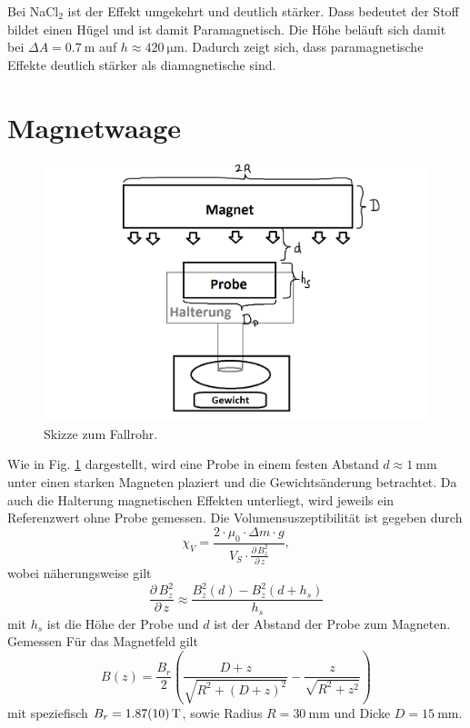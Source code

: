 \documentclass[11pt,a4paper,titlepage, ngerman]{article}
\newcommand{\reffig}[1]{Fig. \ref{fig:#1}}
\begin{document}
	Bei NaCl$_2$ ist der Effekt umgekehrt und deutlich stärker.
	Dass bedeutet der Stoff bildet einen Hügel und ist damit Paramagnetisch.
	Die Höhe beläuft sich damit bei $\Delta A = \SI{0,7}{\meter}$ auf $h \approx \SI{420}{\micro\meter}$.
	Dadurch zeigt sich, dass paramagnetische Effekte deutlich stärker als diamagnetische sind.
	
	\section{Magnetwaage}
	\begin{figure}[ht]
		\includegraphics[width=\textwidth]{SkizzeMagnetwaage.png}
		\caption{Skizze zum Fallrohr.}
		\label{fig:magnetwaage}
	\end{figure}
	Wie in \reffig{magnetwaage} dargestellt, wird eine Probe in einem festen Abstand $d\approx\SI{1}{\milli\meter}$ unter einen starken Magneten plaziert und die Gewichtsänderung betrachtet.
	Da auch die Halterung magnetischen Effekten unterliegt, wird jeweils ein Referenzwert ohne Probe gemessen.
	Die Volumensuszeptibilität ist gegeben durch
	\begin{equation}
		\chi_V = \frac{2 \cdot \mu_0 \cdot \Delta m \cdot g}{V_S \cdot \frac{\partial\,B^2_z}{\partial\,z}},
	\end{equation}
	wobei näherungsweise gilt
	\begin{equation}
		\frac{\partial\,B^2_z}{\partial\,z} \approx \frac{B_z^2(d) - B_z^2(d+h_s)}{h_s}
	\end{equation}
	mit $h_s$ ist die Höhe der Probe und $d$ ist der Abstand der Probe zum Magneten.
	Gemessen 
	Für das Magnetfeld gilt
	\begin{equation}
		B(z) = \frac{B_r}{2}\left( \frac{D+z}{\sqrt{R^2 + (D+z)^2}} - \frac{z}{\sqrt{R^2 + z^2}}\right)
	\end{equation}
	mit speziefisch $B_r = \SI{1,87+-0,1}{T}$, sowie Radius $R = \SI{30}{\milli\meter}$ und Dicke $D = \SI{15}{\milli\meter}$.
	
\end{document}

